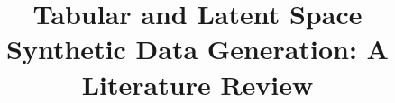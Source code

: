 \documentclass{bmcart}
\begin{document}
\begin{frontmatter}

\begin{fmbox}


\title{Tabular and Latent Space Synthetic Data Generation: A Literature Review}


\author[
  addressref={aff1},                   %
  corref={aff1},                       %
  email={jpfonseca@novaims.unl.pt}   %
]{ }
\author[
  addressref={aff1},
  email={bacao@novaims.unl.pt}
]{ }


\address[id=aff1]{%
  ,             %
  ,          %
  ,                              %
}



\end{fmbox}
\end{frontmatter}
\end{document}
